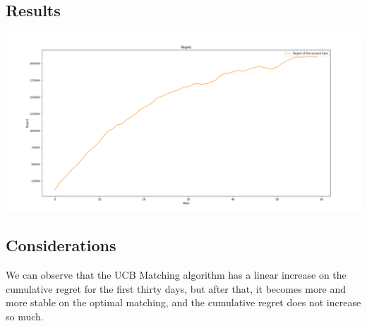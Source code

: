 \subsection*{Results}
\begin{center}
	\includegraphics[scale=0.30]{Images/n5}
\end{center}
\subsection*{Considerations}
We can observe that the UCB Matching algorithm has a linear increase on the cumulative regret for the first thirty days, but after that, it becomes more and more stable on the optimal matching, and the cumulative regret does not increase so much.